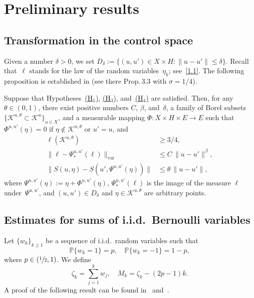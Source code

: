 \documentclass[JEP,XML,SOM,Unicode,ThmDefs]{cedram}
\let\mathcal\mathscr
\theoremstyle{plain}
\numberwithin{equation}{section}
\newcommand{\IP}{{\mathbb P}}
\newcommand{\KK}{{\mathcal K}}
\begin{document}
\section{Preliminary results}
\label{s2}

\subsection{Transformation in the control space}
Given a number $\delta>0$, we set $D_\delta:=\{(u,u')\in X\times H:\|u-u'\|\le\delta\}$. Recall that~$\ell$ stands for the law of the random variables~$\eta_k$; see~\eqref{1.1}. The following proposition is established in \cite[\S3.2]{KNS-2020} (see there Prop.\,3.3 with $\sigma=1/4$).

\begin{proposition}\label{P:2.5}
Suppose that Hypotheses~\hyperlink{H1}{\rm(H$_1$)}, \hyperlink{H3}{\rm(H$_3$)}, and~\hyperlink{H4}{\rm(H$_4$)} are satisfied. Then, for any $\theta\in(0,1)$, there exist positive numbers $C$, $\beta$, and~$\delta$, a family of Borel subsets $\{\KK^{u,\theta}\subset \KK^u\}_{u\in X}$, and a measurable mapping $\varPhi : X\times H \times E \to E$ such that $\varPhi^{u,u'}(\eta)=0$ if $\eta\notin \KK^{u,\theta}$ or $u'=u$, and
\begin{align}
\ell(\KK^{u,\theta})&\ge 3/4,
\label{3.7}\\
\|\ell-\varPsi_*^{u,u'}( \ell)\|_{\mathrm{var}}&\le C\, \|u-u'\|^\beta,
\label{3.8}\\
\|S(u,\eta)- S(u',\varPsi^{u,u'}(\eta))\| &\le \theta\, \|u-u'\|,
\label{3.9}
\end{align}
where $\varPsi^{u,u'}(\eta):=\eta+\varPhi^{u,u'}(\eta)$, $\varPsi_*^{u,u'}( \ell)$ is the image of the measure $\ell$ under~$\varPsi^{u,u'}$, and $(u,u')\in D_\delta$ and $\eta\in \KK^{u,\theta}$ are arbitrary points.
\end{proposition}

\subsection{Estimates for sums of i.i.d.\ Bernoulli variables}
\label{s2.1}
Let $\{w_k\}_{k\ge1}$ be a sequence of i.i.d.\ random variables such that
\[
\IP\{w_k=1\}=p, \quad \IP\{w_k=-1\}=1-p,
\]
where $p\in(\sfrac12,1)$. We define
\begin{equation}\label{2.2}
\zeta_k=\sum_{j=1}^kw_j, \quad M_k=\zeta_k-(2p-1)k.
\end{equation}
A proof of the following result can be found in~\cite[\S 12]{lamperti1996} and~\cite[\S XIV.2]{feller1968}.
\end{document}
